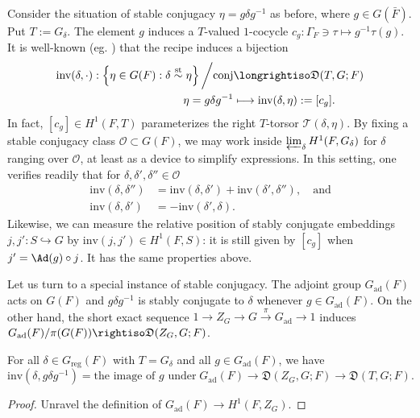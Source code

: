 \documentclass[a4paper,10pt]{article}
\begin{document}
Consider the situation of stable conjugacy $\eta = g\delta g^{-1}$ as before, where $g \in G(\bar{F})$. Put $T := G_\delta$. The element $g$ induces a $T$-valued $1$-cocycle $c_g: \Gamma_F \ni \tau \mapsto g^{-1}\tau(g)$. It is well-known (eg. \cite[\S 27]{ArIntro}) that the recipe induces a bijection
\begin{equation}\label{eqn:inv} \begin{aligned}
	\text{inv}(\delta, \cdot): \left\{ \eta \in G(F): \delta \stackrel{\text{st}}{\sim} \eta \right\} \bigg/ \text{conj} & \longrightiso \mathfrak{D}(T, G; F) \\
	\eta = g\delta g^{-1} & \longmapsto \text{inv}(\delta, \eta) := [c_g].
\end{aligned}\end{equation}
In fact, $[c_g] \in H^1(F, T)$ parameterizes the right $T$-torsor $\mathcal{T}(\delta, \eta)$. By fixing a stable conjugacy class $\mathcal{O} \subset G(F)$, we may work inside $\varprojlim_\delta H^1(F, G_\delta)$ for $\delta$ ranging over $\mathcal{O}$, at least as a device to simplify expressions. In this setting, one verifies readily that for $\delta, \delta', \delta'' \in \mathcal{O}$
\begin{equation}\label{eqn:st-conj-in-stages}\begin{aligned}
	\text{inv}(\delta, \delta'') & = \text{inv}(\delta, \delta') + \text{inv}(\delta', \delta''), \quad \text{and} \\
	\text{inv}(\delta, \delta') & = -\text{inv}(\delta', \delta).
\end{aligned}\end{equation}
Likewise, we can measure the relative position of stably conjugate embeddings $j,j': S \hookrightarrow G$ by $\text{inv}(j, j') \in H^1(F, S)$: it is still given by $[c_g]$ when $j' = \Ad(g) \circ j$. It has the same properties above. 

Let us turn to a special instance of stable conjugacy. The adjoint group $G_\text{ad}(F)$ acts on $G(F)$ and $g \delta g^{-1}$ is stably conjugate to $\delta$ whenever $g \in G_\text{ad}(F)$. On the other hand, the short exact sequence $1 \to Z_G \to G \xrightarrow{\pi} G_\text{ad} \to 1$ induces $G_\text{ad}(F)/\pi(G(F)) \rightiso \mathfrak{D}(Z_G, G; F)$.
\begin{proposition}\label{prop:adjoint-rel-pos}
	For all $\delta \in G_\mathrm{reg}(F)$ with $T = G_\delta$ and all $g \in G_\mathrm{ad}(F)$, we have
	\[ \mathrm{inv}(\delta, g\delta g^{-1}) = \text{the image of $g$ under}\; G_\mathrm{ad}(F) \to \mathfrak{D}(Z_G, G; F) \to \mathfrak{D}(T, G; F). \]
\end{proposition}
\begin{proof}
	Unravel the definition of $G_\text{ad}(F) \to H^1(F, Z_G)$.
\end{proof}
\end{document}
